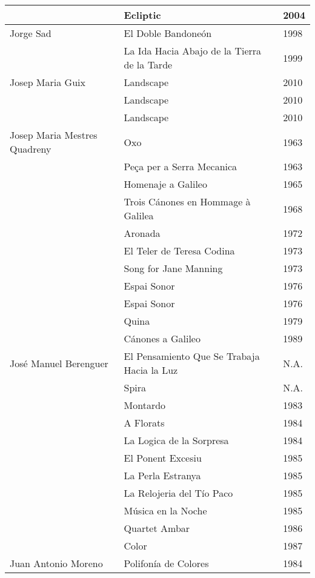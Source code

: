 \begin{center}
\begin{longtable}{ p{}  p{}  p{} }
& Ecliptic & 2004 \\ \midrule 
Jorge Sad & El Doble Bandoneón & 1998 \\ \cmidrule (r){2-3} 
& La Ida Hacia Abajo de la Tierra de la Tarde & 1999 \\ \midrule 
Josep Maria Guix & Landscape & 2010 \\ \cmidrule (r){2-3} 
& Landscape & 2010 \\ \cmidrule (r){2-3} 
& Landscape & 2010 \\ \midrule 
Josep Maria Mestres Quadreny & Oxo & 1963 \\ \cmidrule (r){2-3} 
& Peça per a Serra Mecanica & 1963 \\ \cmidrule (r){2-3} 
& Homenaje a Galileo & 1965 \\ \cmidrule (r){2-3} 
& Trois Cánones en Hommage à Galilea & 1968 \\ \cmidrule (r){2-3} 
& Aronada & 1972 \\ \cmidrule (r){2-3} 
& El Teler de Teresa Codina & 1973 \\ \cmidrule (r){2-3} 
& Song for Jane Manning & 1973 \\ \cmidrule (r){2-3} 
& Espai Sonor & 1976 \\ \cmidrule (r){2-3} 
& Espai Sonor & 1976 \\ \cmidrule (r){2-3} 
& Quina & 1979 \\ \cmidrule (r){2-3} 
& Cánones a Galileo & 1989 \\ \midrule 
José Manuel Berenguer & El Pensamiento Que Se Trabaja Hacia la Luz & N.A. \\ \cmidrule (r){2-3} 
& Spira & N.A. \\ \cmidrule (r){2-3} 
& Montardo & 1983 \\ \cmidrule (r){2-3} 
& A Florats & 1984 \\ \cmidrule (r){2-3} 
& La Logica de la Sorpresa & 1984 \\ \cmidrule (r){2-3} 
& El Ponent Excesiu & 1985 \\ \cmidrule (r){2-3} 
& La Perla Estranya & 1985 \\ \cmidrule (r){2-3} 
& La Relojeria del Tío Paco & 1985 \\ \cmidrule (r){2-3} 
& Música en la Noche & 1985 \\ \cmidrule (r){2-3} 
& Quartet Ambar & 1986 \\ \cmidrule (r){2-3} 
& Color & 1987 \\ \midrule 
Juan Antonio Moreno & Polifonía de Colores & 1984 \\ \cmidrule (r){2-3} 

\end{longtable}
\end{center}
